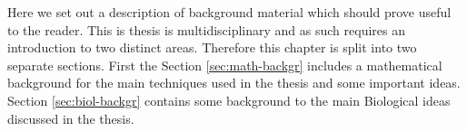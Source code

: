 
Here we set out a description of background material which should prove useful to the reader. This is thesis is multidisciplinary and as such requires an introduction to two distinct areas. Therefore this chapter is split into two separate sections. First the Section \ref{sec:math-backgr} includes a mathematical background for the main techniques used in the thesis {\color{red} and some important ideas}. Section \ref{sec:biol-backgr} contains some background to the main Biological ideas discussed in the thesis. 


